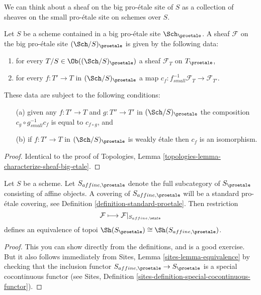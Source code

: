\noindent
We can think about a sheaf on the big pro-\'etale site of $S$ as a collection
of sheaves on the small pro-\'etale site on schemes over $S$.

\begin{lemma}
\label{lemma-characterize-sheaf-big}
Let $S$ be a scheme contained in a big pro-\'etale site $\Sch_\proetale$.
A sheaf $\mathcal{F}$ on the big pro-\'etale site $(\Sch/S)_\proetale$
is given by the following data:
\begin{enumerate}
\item for every $T/S \in \Ob((\Sch/S)_\proetale)$ a sheaf
$\mathcal{F}_T$ on $T_\proetale$,
\item for every $f : T' \to T$ in
$(\Sch/S)_\proetale$ a map
$c_f : f_{small}^{-1}\mathcal{F}_T \to \mathcal{F}_{T'}$.
\end{enumerate}
These data are subject to the following conditions:
\begin{enumerate}
\item[(a)] given any $f : T' \to T$ and $g : T'' \to T'$ in
$(\Sch/S)_\proetale$ the composition
$c_g \circ g_{small}^{-1}c_f$ is equal to $c_{f \circ g}$, and
\item[(b)] if $f : T' \to T$ in $(\Sch/S)_\proetale$
is weakly \'etale then $c_f$ is an isomorphism.
\end{enumerate}
\end{lemma}

\begin{proof}
Identical to the proof of
Topologies, Lemma \ref{topologies-lemma-characterize-sheaf-big-etale}.
\end{proof}

\begin{lemma}
\label{lemma-alternative}
Let $S$ be a scheme. Let $S_{affine, \proetale}$ denote the full subcategory
of $S_\proetale$ consisting of affine objects. A covering of
$S_{affine, \proetale}$ will be a standard pro-\'etale covering, see
Definition \ref{definition-standard-proetale}.
Then restriction
$$
\mathcal{F} \longmapsto \mathcal{F}|_{S_{affine, \etale}}
$$
defines an equivalence of topoi
$\Sh(S_\proetale) \cong \Sh(S_{affine, \proetale})$.
\end{lemma}

\begin{proof}
This you can show directly from the definitions, and is a good exercise.
But it also follows immediately from
Sites, Lemma \ref{sites-lemma-equivalence}
by checking that the inclusion functor
$S_{affine, \proetale} \to S_\proetale$
is a special cocontinuous functor (see
Sites, Definition \ref{sites-definition-special-cocontinuous-functor}).
\end{proof}

